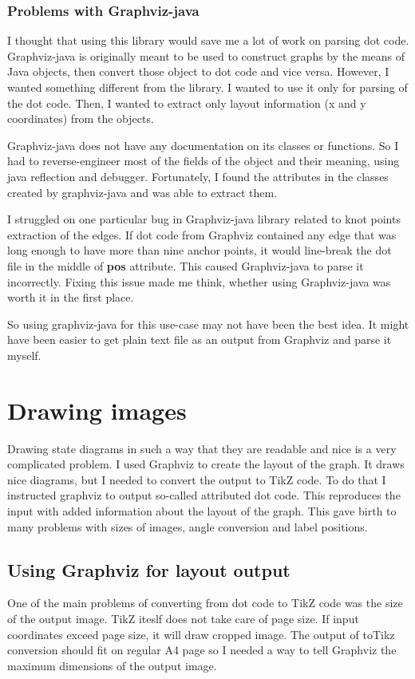 \documentclass{ctuthesis}
\begin{document}
\subsection{Problems with Graphviz-java}
\label{subsec:graphviz-java-problems}
I thought that using this library would save me a lot of work on parsing dot code. Graphviz-java is originally meant to be used to construct graphs by the means of Java objects, then convert those object to dot code and vice versa. However, I wanted something different from the library. I wanted to use it only for parsing of the dot code. Then, I wanted to extract only layout information (x and y coordinates) from the objects. 

Graphviz-java does not have any documentation on its classes or functions. So I had to reverse-engineer most of the fields of the object and their meaning, using java reflection and debugger. Fortunately, I found the attributes in the classes created by graphviz-java and was able to extract them. 

I struggled on one particular bug in Graphviz-java library related to knot points extraction of the edges. If dot code from Graphviz contained any edge that was long enough to have more than nine anchor points, it would line-break the dot file in the middle of \textbf{pos} attribute. This caused Graphviz-java to parse it incorrectly. Fixing this issue made me think, whether using Graphviz-java was worth it in the first place.

So using graphviz-java for this use-case may not have been the best idea. It might have been easier to get plain text file as an output from Graphviz and parse it myself. 

\chapter{Drawing images}
Drawing state diagrams in such a way that they are readable and nice is a very complicated problem. 
I used Graphviz to create the layout of the graph. It draws nice diagrams, but I needed to convert the output to TikZ code. To do that I instructed graphviz to output so-called attributed dot code. This reproduces the input with added information about the layout of the graph. This gave birth to many problems with sizes of images, angle conversion and label positions. 

\section{Using Graphviz for layout output}
\label{sec:problems_graphviz}
One of the main problems of converting from dot code to TikZ code was the size of the output image. 
TikZ iteslf does not take care of page size. If input coordinates exceed page size, it will draw cropped image. The output of toTikz conversion should fit on regular A4 page so I needed a way to tell Graphviz the maximum dimensions of the output image.
\end{document}
